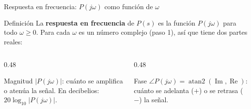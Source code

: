\documentclass[aspectratio=169,11pt]{beamer}
\begin{document}
\begin{frame}{Respuesta en frecuencia: $P(j\omega)$ como función de $\omega$}
  \small
  \setlength{\parskip}{3pt}
  \begin{block}{Definición}
    La \textbf{respuesta en frecuencia} de $P(s)$ es la función $P(j\omega)$ para todo $\omega\ge0$. Para cada $\omega$ es un número complejo (paso 1), así que tiene dos partes reales:
  \end{block}

  \begin{columns}[T]
    \begin{column}{0.48\textwidth}
      \begin{block}{Magnitud}
        $|P(j\omega)|$: cuánto se amplifica o atenúa la señal. En decibelios: $20\log_{10}|P(j\omega)|$.
      \end{block}
    \end{column}
    \begin{column}{0.48\textwidth}
      \begin{block}{Fase}
        $\angle P(j\omega)=\operatorname{atan2}(\operatorname{Im},\operatorname{Re})$: cuánto se adelanta ($+$) o se retrasa ($-$) la señal.
      \end{block}
    \end{column}
  \end{columns}

\end{frame}
\end{document}
